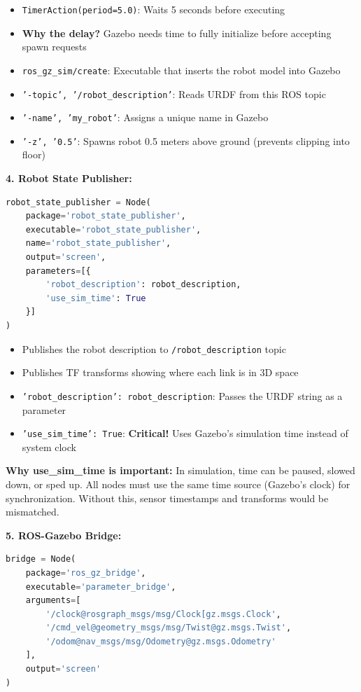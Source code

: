 \begin{itemize}
	\item \texttt{TimerAction(period=5.0)}: Waits 5 seconds before executing
	\item \textbf{Why the delay?} Gazebo needs time to fully initialize before accepting spawn requests
	\item \texttt{ros\_gz\_sim/create}: Executable that inserts the robot model into Gazebo
	\item \texttt{'-topic', '/robot\_description'}: Reads URDF from this ROS topic
	\item \texttt{'-name', 'my\_robot'}: Assigns a unique name in Gazebo
	\item \texttt{'-z', '0.5'}: Spawns robot 0.5 meters above ground (prevents clipping into floor)
\end{itemize}

\textbf{4. Robot State Publisher:}
\begin{lstlisting}[language=Python]
robot_state_publisher = Node(
    package='robot_state_publisher',
    executable='robot_state_publisher',
    name='robot_state_publisher',
    output='screen',
    parameters=[{
        'robot_description': robot_description,
        'use_sim_time': True
    }]
)
\end{lstlisting}

\begin{itemize}
	\item Publishes the robot description to \texttt{/robot\_description} topic
	\item Publishes TF transforms showing where each link is in 3D space
	\item \texttt{'robot\_description': robot\_description}: Passes the URDF string as a parameter
	\item \texttt{'use\_sim\_time': True}: \textbf{Critical!} Uses Gazebo's simulation time instead of system clock
\end{itemize}

\textbf{Why use\_sim\_time is important:} In simulation, time can be paused, slowed down, or sped up. All nodes must use the same time source (Gazebo's clock) for synchronization. Without this, sensor timestamps and transforms would be mismatched.

\textbf{5. ROS-Gazebo Bridge:}
\begin{lstlisting}[language=Python]
bridge = Node(
    package='ros_gz_bridge',
    executable='parameter_bridge',
    arguments=[
        '/clock@rosgraph_msgs/msg/Clock[gz.msgs.Clock',
        '/cmd_vel@geometry_msgs/msg/Twist@gz.msgs.Twist',
        '/odom@nav_msgs/msg/Odometry@gz.msgs.Odometry'
    ],
    output='screen'
)
\end{lstlisting}

